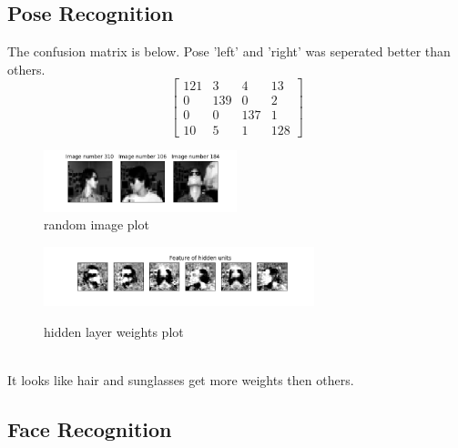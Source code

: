 \documentclass[a4paper]{article}
\begin{document}
\subsection{Pose Recognition}
The confusion matrix is below. Pose 'left' and 'right' was seperated better than others.\\
\[
\begin{bmatrix}
  121 & 3 & 4 & 13 \\
  0 & 139 & 0 & 2 \\
  0 & 0 & 137 & 1 \\
  10 & 5 & 1 & 128
\end{bmatrix}
\]
\begin{figure}[h]
  \begin{center}
  \includegraphics[width=0.5\textwidth]{ex_2_1_random.png}\\
  \caption{random image plot}
  \includegraphics[width=0.7\textwidth]{ex_2_1_hidden.png}\\
  \caption{hidden layer weights plot}
  \end{center}
\end{figure}\\
It looks like hair and sunglasses get more weights then others.
\subsection{Face Recognition}
\end{document}
